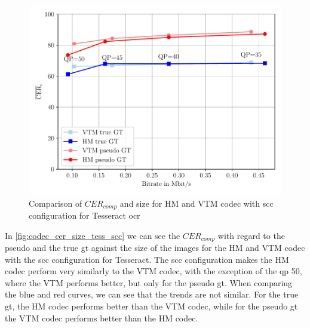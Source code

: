 \begin{figure}[h]
    \centering
    \includegraphics[width=\textwidth]{../images/analyze/codec_cer_size_tess_scc.pdf}
    \caption{Comparison of $CER_{comp}$ and size for HM and VTM codec with \gls{scc} configuration for Tesseract \gls{ocr}}
    \label{fig:codec_cer_size_tess_scc}
\end{figure}

In \autoref{fig:codec_cer_size_tess_scc} we can see the $CER_{comp}$ with regard to the pseudo and the true \gls{gt} against the size of the images for the HM and VTM codec with the \gls{scc} configuration for Tesseract.
The \gls{scc} configuration makes the HM codec perform very similarly to the VTM codec, with the exception of the \gls{qp} 50, where the VTM performs better, but only for the pseudo \gls{gt}.
When comparing the blue and red curves, we can see that the trends are not similar.
For the true \gls{gt}, the HM codec performs better than the VTM codec, while for the pseudo \gls{gt} the VTM codec performs better than the HM codec.

